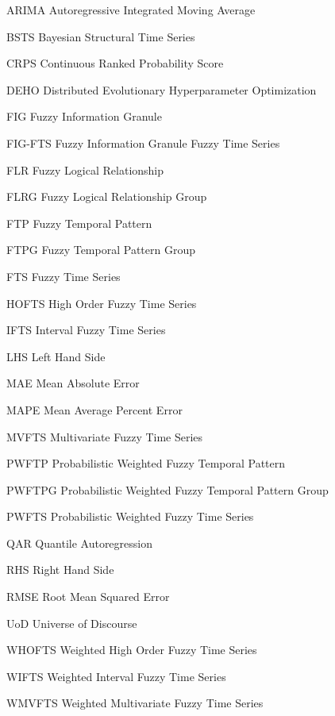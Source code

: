
\begin{siglas}
\item[ARIMA] Autoregressive Integrated Moving Average
\item[BSTS] Bayesian Structural Time Series
\item[CRPS] Continuous Ranked Probability Score
\item[DEHO] Distributed Evolutionary Hyperparameter Optimization
\item[FIG] Fuzzy Information Granule
\item[FIG-FTS] Fuzzy Information Granule Fuzzy Time Series
\item[FLR] Fuzzy Logical Relationship
\item[FLRG] Fuzzy Logical Relationship Group
\item[FTP] Fuzzy Temporal Pattern
\item[FTPG] Fuzzy Temporal Pattern Group
\item[FTS] Fuzzy Time Series
\item[HOFTS] High Order Fuzzy Time Series
\item[IFTS] Interval Fuzzy Time Series
\item[LHS] Left Hand Side
\item[MAE] Mean Absolute Error
\item[MAPE] Mean Average Percent Error
\item[MVFTS] Multivariate Fuzzy Time Series
\item[PWFTP] Probabilistic Weighted Fuzzy Temporal Pattern
\item[PWFTPG] Probabilistic Weighted Fuzzy Temporal Pattern Group
\item[PWFTS] Probabilistic Weighted Fuzzy Time Series
\item[QAR] Quantile Autoregression
\item[RHS] Right Hand Side
\item[RMSE] Root Mean Squared Error
\item[UoD] Universe of Discourse
\item[WHOFTS] Weighted High Order Fuzzy Time Series
\item[WIFTS] Weighted Interval Fuzzy Time Series
\item[WMVFTS] Weighted Multivariate Fuzzy Time Series
\end{siglas}